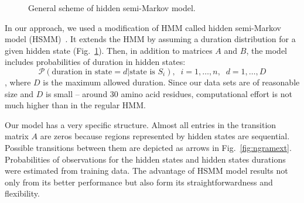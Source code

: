 \documentclass[10pt,letterpaper]{article}
\begin{document}
\begin{figure}[h]
\caption{General scheme of hidden semi-Markov model.}
\label{fig:hsmm}
\end{figure}

In our approach, we used a modification of HMM called hidden semi-Markov model (HSMM)~\cite{Yu2010215}. It extends the HMM by assuming a duration distribution for a given hidden state (Fig.~\ref{fig:hsmm}). Then, in addition to matrices $A$ and $B$, the model includes probabilities of duration in hidden states: 
$$\mathcal{P}(\text{duration in state} = d | \text{state is } S_i), \;\; i = 1, \dots, n, \;\; d = 1, \dots, D$$,
where $D$ is the maximum allowed duration.
Since our data sets are of reasonable size and $D$ is small -- around 30 amino acid residues, computational effort is not much higher than in the regular HMM. 

Our model has a very specific structure. Almost all entries in the transition matrix $A$ are zeros because regions represented by hidden states are sequential. Possible transitions between them are depicted as arrows in Fig.~\ref{fig:ngramext}. Probabilities of observations for the hidden states and hidden states durations were estimated from training data. The advantage of HSMM model results not only from its better performance but also form its straightforwardness and flexibility. 
\end{document}
